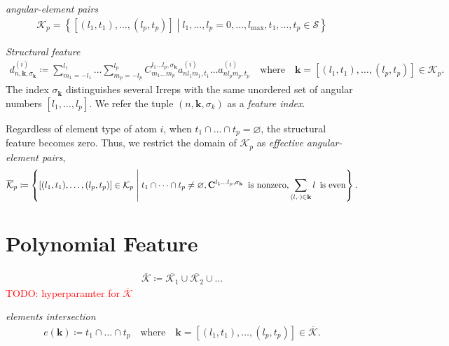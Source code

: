 \documentclass[a4paper, 11pt]{article}
\theoremstyle{definition}
\newcommand{\term}[1]{\textit{#1}}
\newcommand{\todo}[1]{\textcolor{red}{TODO: #1}}
\newcommand{\relmiddle}[1]{\mathrel{}\middle#1\mathrel{}}
\newcommand{\set}[2]{\left\{ #1 \relmiddle| #2 \right\}}
\begin{document}
\term{angular-element pairs}
\begin{align}
  \mathcal{K}_{p}
    = \set{ [ (l_{1}, t_{1}), \dots, (l_{p}, t_{p}) ] }{ l_{1}, \dots, l_{p} = 0, \dots, l_{\mathrm{max}}, t_{1}, \dots, t_{p} \in \mathcal{S} }
\end{align}

\term{Structural feature}
\begin{align}
  d^{(i)}_{n, \mathbf{k}, \sigma_{\mathbf{k}}}
  \coloneqq \sum_{m_{1}=-l_{1}}^{l_{1}} \dots \sum_{m_{p}=-l_{p}}^{l_{p}} C^{l_{1} \dots l_{p}, \sigma_{\mathbf{k}} }_{m_{1} \dots m_{p}} a^{(i)}_{nl_{1}m_{1}, t_{1}} \dots a^{(i)}_{n l_{p} m_{p}, t_{p}}
  \quad \mbox{where} \quad \mathbf{k} = [(l_{1}, t_{1}), \dots, (l_{p}, t_{p}) ] \in \mathcal{K}_{p}.
\end{align}
The index $\sigma_{\mathbf{k}}$ distinguishes several Irreps with the same unordered set of angular numbers $[l_{1}, \dots, l_{p}]$.
We refer the tuple $(n, \mathbf{k}, \sigma_{k})$ as a \term{feature index}.

Regardless of element type of atom $i$, when $t_{1} \cap \dots \cap t_{p} = \varnothing$, the structural feature becomes zero.
Thus, we restrict the domain of $\mathcal{K}_{p}$ as \term{effective angular-element pairs},
\begin{align}
  \overline{\mathcal{K}}_{p}
  \coloneqq
  \set{ [(l_{1}, t_{1}), \dots, (l_{p}, t_{p}) ] \in \mathcal{K}_{p} }{ t_{1} \cap \dots \cap t_{p} \neq \varnothing, \mathbf{C}^{l_{1} \dots l_{p}, \sigma_{\mathbf{k}}} \mbox{\, is nonzero}, \sum_{(l, \cdot) \in \mathbf{k}} l \mbox{\, is even} }.
\end{align}

\section{Polynomial Feature}

\begin{align}
  \overline{\mathcal{K}} \coloneqq \overline{\mathcal{K}_{1}} \cup \overline{\mathcal{K}_{2}} \cup \dots
\end{align}
\todo{hyperparamter for $\overline{\mathcal{K}}$}

\term{elements intersection}
\begin{align}
  e(\mathbf{k}) \coloneqq t_{1} \cap \dots \cap t_{p} \quad \mbox{where} \quad \mathbf{k} = [(l_{1}, t_{1}), \dots, (l_{p}, t_{p})] \in \overline{\mathcal{K}}.
\end{align}
\end{document}
